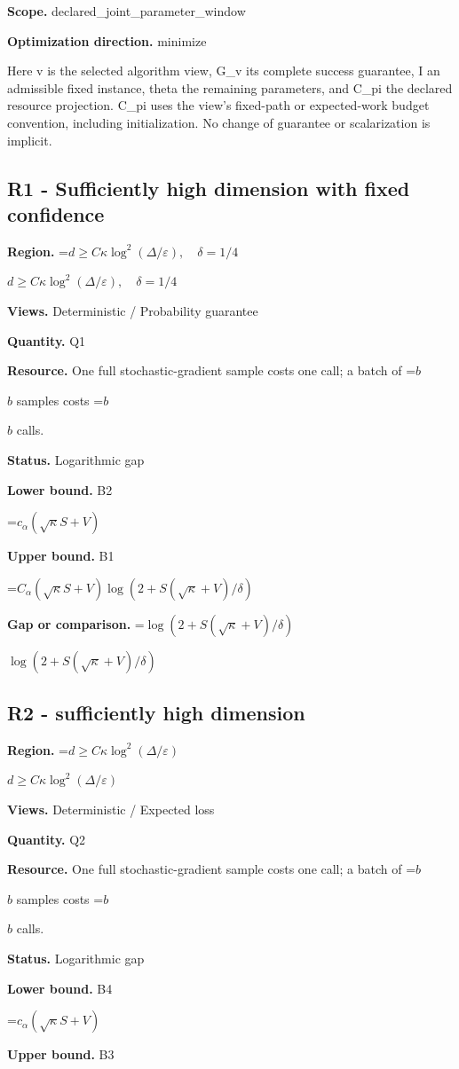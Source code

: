 \documentclass[10pt,a4paper]{article}
\newcommand{\AtlasMath}[1]{\par\begingroup\centering\setbox0=\hbox{$\displaystyle #1$}\ifdim\wd0>1.4\linewidth\typeout{ATLAS WIDE FORMULA: \the\wd0}\fi\ifdim\wd0>\linewidth\resizebox{\linewidth}{!}{\box0}\else\box0\fi\par\endgroup}
\newcommand{\AtlasInlineMath}[1]{\begingroup\setbox0=\hbox{$#1$}\ifdim\wd0>.4\linewidth\endgroup\AtlasMath{#1}\else\endgroup$#1$\fi}
\begin{document}
\textbf{Scope.} declared\_joint\_parameter\_window

\textbf{Optimization direction.} minimize

Here v is the selected algorithm view, G\_v its complete success guarantee, I an admissible fixed instance, theta the remaining parameters, and C\_pi the declared resource projection. C\_pi uses the view's fixed-path or expected-work budget convention, including initialization. No change of guarantee or scalarization is implicit.

\subsection{R1 - Sufficiently high dimension with fixed confidence}
\textbf{Region.} \AtlasInlineMath{d\ge C\kappa\log^2(\Delta/\varepsilon),\quad\delta=1/4}

\textbf{Views.} Deterministic / Probability guarantee

\textbf{Quantity.} Q1

\textbf{Resource.} One full stochastic-gradient sample costs one call; a batch of \AtlasInlineMath{b} samples costs \AtlasInlineMath{b} calls.

\textbf{Status.} Logarithmic gap

\textbf{Lower bound.} B2

\AtlasMath{c_\alpha(\sqrt\kappa S+V)}
\textbf{Upper bound.} B1

\AtlasMath{C_\alpha(\sqrt\kappa S+V)\log(2+S(\sqrt\kappa+V)/\delta)}
\textbf{Gap or comparison.} \AtlasInlineMath{\log(2+S(\sqrt\kappa+V)/\delta)}

\subsection{R2 - sufficiently high dimension}
\textbf{Region.} \AtlasInlineMath{d\ge C\kappa\log^2(\Delta/\varepsilon)}

\textbf{Views.} Deterministic / Expected loss

\textbf{Quantity.} Q2

\textbf{Resource.} One full stochastic-gradient sample costs one call; a batch of \AtlasInlineMath{b} samples costs \AtlasInlineMath{b} calls.

\textbf{Status.} Logarithmic gap

\textbf{Lower bound.} B4

\AtlasMath{c_\alpha(\sqrt\kappa S+V)}
\textbf{Upper bound.} B3
\end{document}

